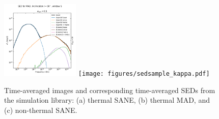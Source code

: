 \begin{figure}
  \includegraphics[width=0.333\textwidth]{figures/sedsample_MAD.pdf}%
  \texttt{[image: figures/sedsample\_kappa.pdf]}
  \caption{Time-averaged images and corresponding time-averaged SEDs from the simulation library:
    (a) thermal SANE, (b) thermal MAD, and (c) non-thermal SANE.}
  \label{fig:fiducial_imgs}
\end{figure}

